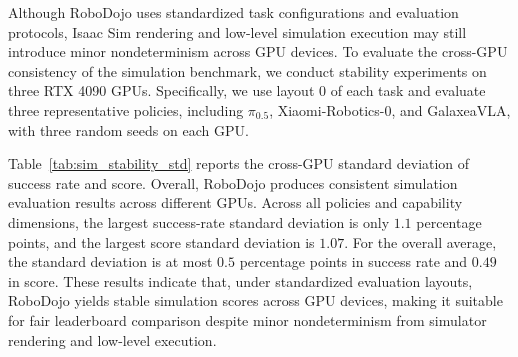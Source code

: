 Although RoboDojo uses standardized task configurations and evaluation protocols, Isaac Sim rendering and low-level simulation execution may still introduce minor nondeterminism across GPU devices. To evaluate the cross-GPU consistency of the simulation benchmark, we conduct stability experiments on three RTX 4090 GPUs. Specifically, we use layout 0 of each task and evaluate three representative policies, including $\pi_{0.5}$, Xiaomi-Robotics-0, and GalaxeaVLA, with three random seeds on each GPU.

\begin{table}
\vspace{-8pt}
\centering
\caption{\textbf{Real-world evaluation stability.}
We report the standard deviation across three repeated runs. Full per-task results are in Appendix Table~\ref{tab:real_world_consistency_std_full}.}
\label{tab:real_world_consistency_compact}
\vspace{-4pt}
\tiny
\setlength{\tabcolsep}{2pt}
\vspace{-10pt}
\end{table}

Table~\ref{tab:sim_stability_std} reports the cross-GPU standard deviation of success rate and score. Overall, RoboDojo produces consistent simulation evaluation results across different GPUs. Across all policies and capability dimensions, the largest success-rate standard deviation is only $1.1$ percentage points, and the largest score standard deviation is $1.07$. For the overall average, the standard deviation is at most $0.5$ percentage points in success rate and $0.49$ in score. These results indicate that, under standardized evaluation layouts, RoboDojo yields stable simulation scores across GPU devices, making it suitable for fair leaderboard comparison despite minor nondeterminism from simulator rendering and low-level execution.

